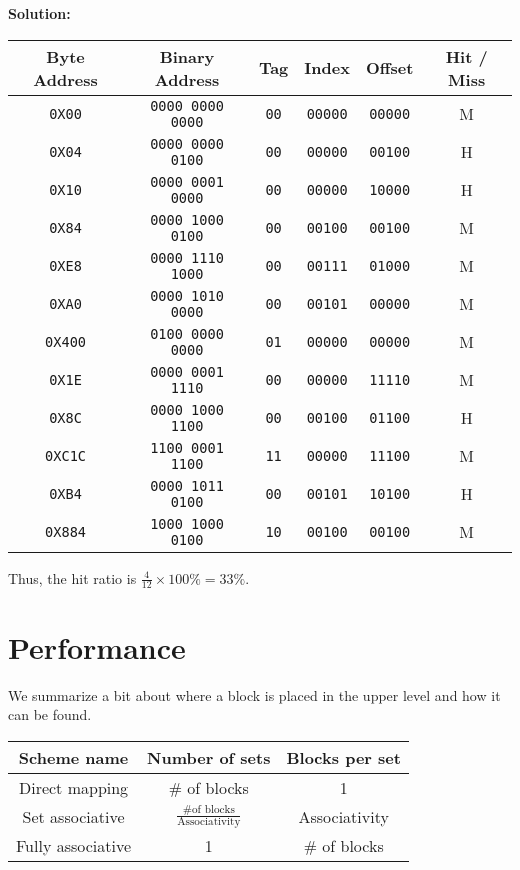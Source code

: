 \begin{eg}
\textbf{Solution:} 
\begin{table}[H]
  \centering
  \begin{tabular}{c|c|c|c|c|c}
      \toprule
      Byte Address & Binary Address & Tag & Index & Offset & Hit / Miss  \\
    \midrule
      \verb|0X00| & \verb|0000 0000 0000| & \verb|00| & \verb|00000| & \verb|00000| & M  \\
      \verb|0X04| & \verb|0000 0000 0100| & \verb|00| & \verb|00000| & \verb|00100| & H  \\
      \verb|0X10| & \verb|0000 0001 0000| & \verb|00| & \verb|00000| & \verb|10000| & H  \\
      \verb|0X84| & \verb|0000 1000 0100| & \verb|00| & \verb|00100| & \verb|00100| & M  \\
      \verb|0XE8| & \verb|0000 1110 1000| & \verb|00| & \verb|00111| & \verb|01000| & M  \\
      \verb|0XA0| & \verb|0000 1010 0000| & \verb|00| & \verb|00101| & \verb|00000| & M  \\
      \verb|0X400| & \verb|0100 0000 0000| & \verb|01| & \verb|00000| & \verb|00000| & M  \\
      \verb|0X1E| & \verb|0000 0001 1110| & \verb|00| & \verb|00000| & \verb|11110| & M  \\
      \verb|0X8C| & \verb|0000 1000 1100| & \verb|00| & \verb|00100| & \verb|01100| & H  \\
      \verb|0XC1C| & \verb|1100 0001 1100| & \verb|11| & \verb|00000| & \verb|11100| & M  \\
      \verb|0XB4| & \verb|0000 1011 0100| & \verb|00| & \verb|00101| & \verb|10100| & H  \\
      \verb|0X884| & \verb|1000 1000 0100| & \verb|10| & \verb|00100| & \verb|00100| & M  \\
      \bottomrule
  \end{tabular}
\end{table}

Thus, the hit ratio is \(\frac{4}{12} \times 100\% = 33\%\). 
\end{eg}

\section{Performance}
We summarize a bit about where a block is placed in the upper level and how it can be found.
\begin{table}[H]
  \centering
  \begin{tabular}{c|c|c}
      \toprule
      Scheme name & Number of sets & Blocks per set  \\
    \midrule
      Direct mapping & \# of blocks & 1  \\
      Set associative & \(\frac{\text{\# of blocks}}{\text{Associativity}}\) & Associativity  \\
      Fully associative & 1 & \# of blocks  \\
      \bottomrule
  \end{tabular}
\end{table}

